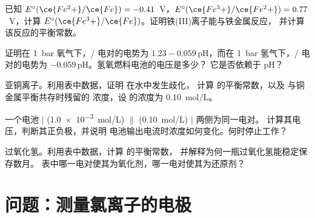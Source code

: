 \begin{exercise}[$\star\star$]\label{exo:b1:nernst:8}
已知 $E^\circ(\ce{Fe^2+}/\ce{Fe}) = -0.41$~V，$E^\circ(\ce{Fe^3+}/\ce{Fe^2+})
= 0.77$~V，计算 $E^\circ(\ce{Fe^3+}/\ce{Fe})$。证明铁(III)离子能与铁金属反应，
并计算该反应的平衡常数。
\end{exercise}

\begin{exercise}[$\star\star$]\label{exo:b1:nernst:9}
证明在 \qty{1}{bar} 氧气下，/ 电对的电势为
$1.23 - 0.059\,\mathrm{pH}$，而在 \qty{1}{bar} 氢气下，/ 电对的电势为
$-0.059\,\mathrm{pH}$。氢氧燃料电池的电压是多少？
它是否依赖于 pH？
\end{exercise}

\begin{exercise}[$\star\star\star$]\label{exo:b1:nernst:10}
亚铜离子。利用表中数据，证明  在水中发生歧化，
计算  的平衡常数，以及
与铜金属平衡共存时残留的  浓度，设
 的浓度为 \qty{0.10}{mol/L}。
\end{exercise}

\begin{exercise}[$\star\star\star$]\label{exo:b1:nernst:11}
一个电池  $|$  (\qty{1.0e-3}{mol/L}) $\|$ 
(\qty{0.10}{mol/L}) $|$  两侧为同一电对。
计算其电压，判断其正负极，并说明
电池输出电流时浓度如何变化。何时停止工作？
\end{exercise}

\begin{exercise}[$\star\star\star$]\label{exo:b1:nernst:12}
过氧化氢。利用表中数据，计算
 的平衡常数，
并解释为何一瓶过氧化氢能稳定保存数月。
表中哪一电对使其为氧化剂，哪一电对使其为还原剂？
\end{exercise}

\section{问题：测量氯离子的电极}

